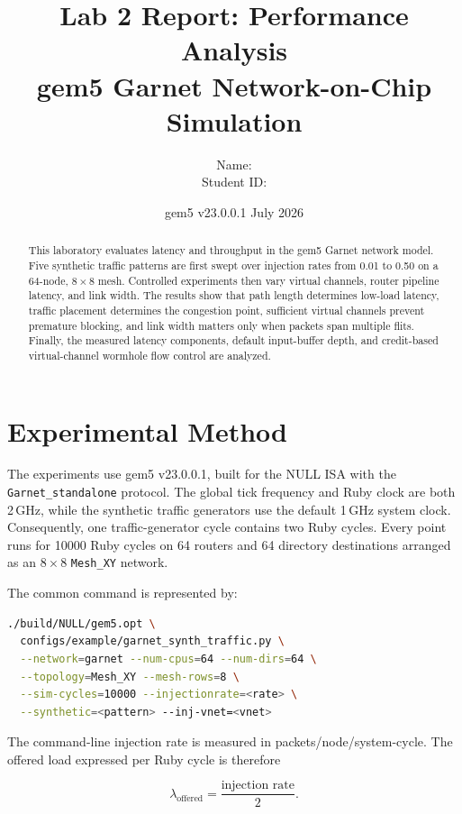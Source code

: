 \documentclass[11pt,a4paper]{article}
\title{\textbf{Lab 2 Report: Performance Analysis}\\[0.4em]
       \large gem5 Garnet Network-on-Chip Simulation}
\author{\begin{tabular}{rl}
          Name: & \rule{7cm}{0.4pt} \\
          Student ID: & \rule{7cm}{0.4pt}
        \end{tabular}}
\date{gem5 v23.0.0.1 \quad July 2026}
\newcommand{\code}[1]{\texttt{#1}}
\begin{document}
\maketitle

\begin{abstract}
This laboratory evaluates latency and throughput in the gem5 Garnet network
model. Five synthetic traffic patterns are first swept over injection rates
from 0.01 to 0.50 on a 64-node, $8\times8$ mesh. Controlled experiments then
vary virtual channels, router pipeline latency, and link width. The results
show that path length determines low-load latency, traffic placement determines
the congestion point, sufficient virtual channels prevent premature blocking,
and link width matters only when packets span multiple flits. Finally, the
measured latency components, default input-buffer depth, and credit-based
virtual-channel wormhole flow control are analyzed.
\end{abstract}

\tableofcontents
\newpage

\section{Experimental Method}

The experiments use gem5 v23.0.0.1, built for the NULL ISA with the
\code{Garnet\_standalone} protocol. The global tick frequency and Ruby clock
are both 2\,GHz, while the synthetic traffic generators use the default 1\,GHz
system clock. Consequently, one traffic-generator cycle contains two Ruby
cycles. Every point runs for 10000 Ruby cycles on 64 routers and 64 directory
destinations arranged as an $8\times8$ \code{Mesh\_XY} network.

The common command is represented by:

\begin{lstlisting}[language=bash]
./build/NULL/gem5.opt \
  configs/example/garnet_synth_traffic.py \
  --network=garnet --num-cpus=64 --num-dirs=64 \
  --topology=Mesh_XY --mesh-rows=8 \
  --sim-cycles=10000 --injectionrate=<rate> \
  --synthetic=<pattern> --inj-vnet=<vnet>
\end{lstlisting}

The command-line injection rate is measured in packets/node/system-cycle. The
offered load expressed per Ruby cycle is therefore

\begin{equation}
\lambda_{\mathrm{offered}}
=\frac{\text{injection rate}}{2}.
\end{equation}
\end{document}
